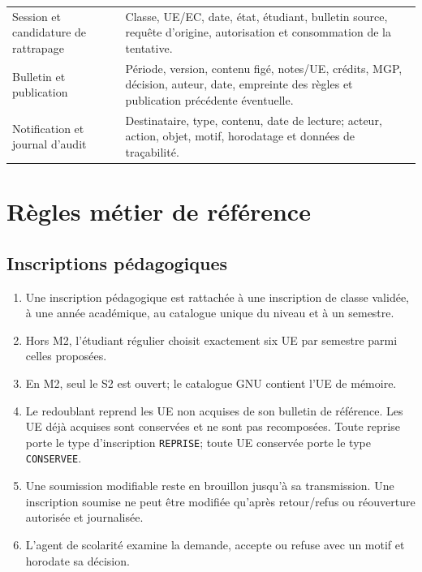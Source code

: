 \documentclass[11pt,a4paper]{article}
\begin{document}
\begin{longtable}{L{3.3cm}L{12.0cm}}
Session et candidature de rattrapage & Classe, UE/EC, date, état, étudiant, bulletin source, requête d'origine, autorisation et consommation de la tentative. \\
Bulletin et publication & Période, version, contenu figé, notes/UE, crédits, MGP, décision, auteur, date, empreinte des règles et publication précédente éventuelle. \\
Notification et journal d'audit & Destinataire, type, contenu, date de lecture; acteur, action, objet, motif, horodatage et données de traçabilité. \\
\bottomrule
\end{longtable}

\section{Règles métier de référence}

\subsection{Inscriptions pédagogiques}
\begin{enumerate}
  \item Une inscription pédagogique est rattachée à une inscription de classe validée, à une année académique, au catalogue unique du niveau et à un semestre.
  \item Hors M2, l'étudiant régulier choisit exactement six UE par semestre parmi celles proposées.
  \item En M2, seul le S2 est ouvert; le catalogue GNU contient l'UE de mémoire.
  \item Le redoublant reprend les UE non acquises de son bulletin de référence. Les UE déjà acquises sont conservées et ne sont pas recomposées. Toute reprise porte le type d'inscription \texttt{REPRISE}; toute UE conservée porte le type \texttt{CONSERVEE}.
  \item Une soumission modifiable reste en brouillon jusqu'à sa transmission. Une inscription soumise ne peut être modifiée qu'après retour/refus ou réouverture autorisée et journalisée.
  \item L'agent de scolarité examine la demande, accepte ou refuse avec un motif et horodate sa décision.
\end{enumerate}
\end{document}
